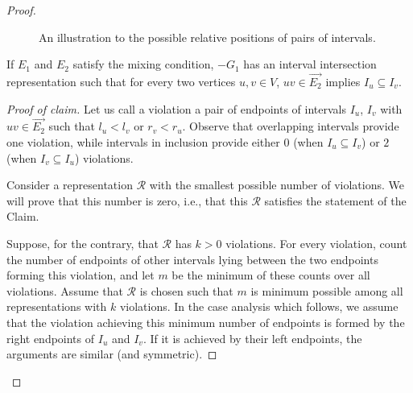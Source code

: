 \begin{proof}
	\begin{figure}[!ht]\centering
		\caption{An illustration to the possible relative positions of pairs of intervals.}
	\end{figure}
	
	\begin{claim}
		If $E_1$ and $E_2$ satisfy the mixing condition, $-G_1$ has an interval intersection representation such that for every two vertices $u, v \in V$, $uv \in \overrightarrow{E_2}$ implies $I_u \subseteq I_v$.
	\end{claim}
	
	\begin{proof}[Proof of claim]
		Let us call a violation a pair of endpoints of intervals $I_u$, $I_v$ with $uv \in \overrightarrow{E_2}$ such that $l_u < l_v$ or $r_v < r_u$. Observe that overlapping intervals provide one violation, while intervals in inclusion provide either $0$ (when $I_u \subseteq I_v$) or $2$ (when $I_v \subseteq I_u$) violations.
		
		Consider a representation $\mathcal{R}$ with the smallest possible number of violations. We will prove that
		this number is zero, i.e., that this $\mathcal{R}$ satisfies the statement of the Claim.
		
		Suppose, for the contrary, that $\mathcal{R}$ has $k > 0$ violations. For every violation, count the number of endpoints of other intervals lying between the two endpoints forming this violation, and let $m$ be the minimum of these counts over all violations. Assume that $\mathcal{R}$ is chosen such that $m$ is minimum possible among all representations with $k$ violations. In the case analysis which follows, we assume that the violation achieving this minimum number of endpoints is formed by the right endpoints of $I_u$ and $I_v$. If it is achieved by their left endpoints, the arguments are similar (and symmetric).
		

\end{proof}
\end{proof}
